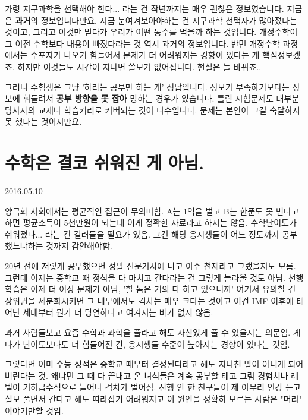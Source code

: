 가령 지구과학을 선택해야 한다... 라는 건 작년까지는 매우 괜찮은 정보였습니다. 지금은 \textbf{과거}의 정보입니다만요.
지금 눈여겨보아야하는 건 지구과학 선택자가 많아졌다는 것이고, 그리고 이것만 믿다가 우리가 어떤 통수를 먹을까 하는 것입니다.
개정수학이 그 이전 수학보다 내용이 빠졌다라는 것 역시 과거의 정보입니다.
반면 개정수학 과정에서는 수포자가 나오기 힘들어서 문제가 더 어려워지는 경향이 있다는 게 핵심정보겠죠.
하지만 이것들도 시간이 지나면 쓸모가 없어집니다. 현실은 늘 바뀌죠..
\vspace{5mm}

그러니 수험생은 그냥 '하라는 공부만 하는 게' 정답입니다.
정보가 부족하기보다는 정보에 휘둘려서 \textbf{공부 방향을 못 잡아} 망하는 경우가 있습니다.
틀린 시험문제도 대부분 당사자의 교재나 학습커리로 커버되는 것이 다수입니다. 문제는 본인이 그걸 숙달하지 못 했다는 것이지만요.
\vspace{5mm}









\section{수학은 결코 쉬워진 게 아님.}
\href{https://www.kockoc.com/Apoc/767358}{2016.05.10}

\vspace{5mm}

양극화 사회에서는 평균적인 접근이 무의미함.
A는 1억을 벌고 B는 한푼도 못 번다고 하면 평균소득이 5천만원이 되는데 이게 정확한 자료라고 하지는 않음.
수학난이도가 쉬워졌다... 라는 건 걸러들을 필요가 있음.
그건 해당 응시생들이 어느 정도까지 공부했느냐하는 것까지 감안해야함.
\vspace{5mm}

20년 전에 저렇게 공부했으면 정말 신문기사에 나고 아주 천재라고 그랬을지도 모름.
그런데 이제는 중학교 때 정석을 다 마치고 간다라는 건 그렇게 놀라울 것도 아님.
선행학습은 이제 더 이상 문제가 아님, '할 놈은 거의 다 하고 있으니까'
여기서 유의할 건 상위권을 세분화시키면 그 내부에서도 격차는 매우 크다는 것이고
이건 IMF 이후에 태어난 세대부터 뭔가 더 당연하다고 여겨지는 바가 없지 않음.
\vspace{5mm}

과거 사람들보고 요즘 수학과 과학을 풀라고 해도 자신있게 풀 수 있을지는 의문임.
게다가 난이도보다도 더 힘들어진 건, 응시생들 수준이 높아지는 경향이 있다는 것임.
\vspace{5mm}

그렇다면 이미 수능 성적은 중학교 때부터 결정된다라고 해도 지나친 말이 아니게 되어버린다는 것.
왜냐면 그 때 다 끝내고 온 녀석들은 계속 공부할 테고 그럼 경험치나 레벨이 기하급수적으로 늘어나 격차가 벌어짐.
선행 안 한 친구들이 제 아무리 인강 듣고 실모 풀면서 간다고 해도 따라잡기 어려워지고
이 원인을 정확히 모르는 사람은 "머리" 이야기만할 것임.
\vspace{5mm}

